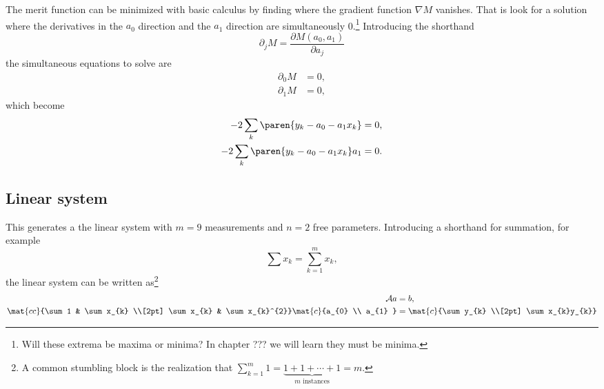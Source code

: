 The merit function can be minimized with basic calculus by finding where the gradient function $\nabla M$ vanishes. That is look for a solution where the derivatives in the $a_{0}$ direction and the $a_{1}$ direction are simultaneously 0.\footnote{Will these extrema be maxima or minima? In chapter ??? we will learn they must be minima.} Introducing the shorthand
  \begin{equation*}
    \partial_{j} M = \frac{\partial M(a_{0}, a_{1})}{\partial a_{j}}
  \end{equation*}
the simultaneous equations to solve are
\begin{equation}
  \begin{split}
    \partial_{0} M &= 0, \\
    \partial_{1} M &= 0,
  \end{split}
\end{equation}
which become
\begin{equation}
  \begin{split}
    -2 \sum_{k} \paren{y_{k} - a_{0} - a_{1}x_{k}}  &= 0, \\
    -2 \sum_{k} \paren{y_{k} - a_{0} - a_{1}x_{k}} a_{1}  &= 0.
  \end{split}
\end{equation}

\subsection{Linear system}
This generates a the linear system with $m=9$ measurements and $n=2$ free parameters. Introducing a shorthand for summation, for example
  \begin{equation}
    \sum x_{k} = \sum_{k=1}^{m} x_{k} ,
  \end{equation}
the linear system can be written as\footnote{A common stumbling block is the realization that $\sum_{k=1}^{m}1 = \underbrace{1+1+\cdots+1}_{m\text{ instances}}=m$.}
  \begin{equation}
    \begin{split}
      \mathcal{A} a &= b, \\
      \mat{cc}{\sum 1 & \sum x_{k} \\[2pt] \sum x_{k} & \sum x_{k}^{2}}
      \mat{c}{a_{0} \\ a_{1} } &= 
      \mat{c}{\sum y_{k} \\[2pt] \sum x_{k}y_{k}}
    \end{split}
    \label{eqn:calculus}
  \end{equation}


